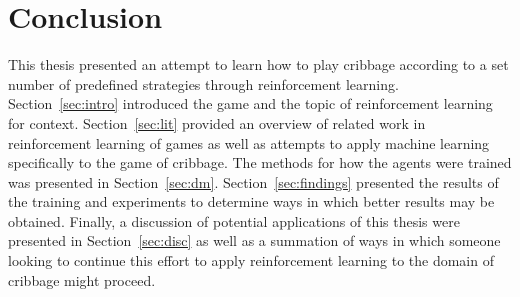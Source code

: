 \section{Conclusion}
\label{sec:conclusion}


This thesis presented an attempt to learn how to play cribbage according
to a set number of predefined strategies through reinforcement learning.
%
Section~\ref{sec:intro} introduced the game and the topic of reinforcement
learning for context.
%
Section~\ref{sec:lit} provided an overview of related work in
reinforcement learning of games as well as attempts to apply machine learning
specifically to the game of cribbage.
%
The methods for how the agents were trained was presented in
Section~\ref{sec:dm}.
%
Section~\ref{sec:findings}
presented the results of the training and 
experiments to determine ways in which better results may be obtained.
%
Finally,
a discussion of potential applications of this thesis were presented
in Section~\ref{sec:disc}
as well as a summation of ways in which someone looking to continue this effort
to apply reinforcement learning to the domain of cribbage might proceed.

